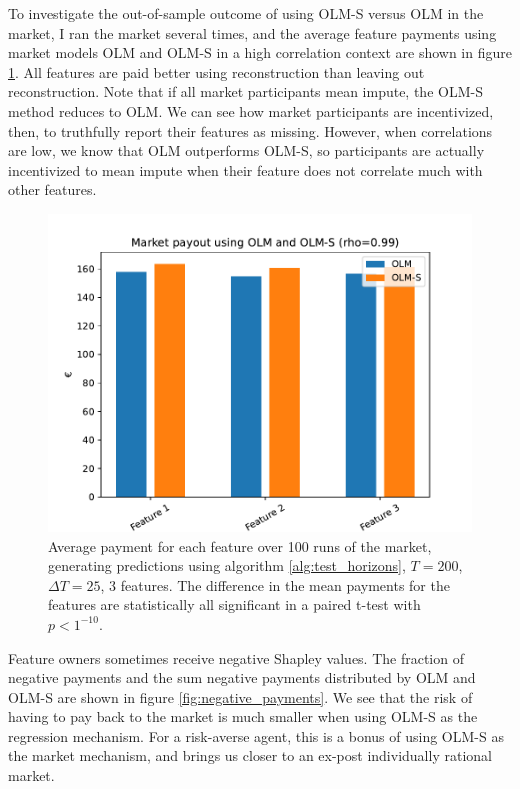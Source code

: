 To investigate the out-of-sample outcome of using OLM-S versus OLM in the
market, I ran the market several times, and the average feature payments using
market models OLM and OLM-S in a high correlation context are shown in figure
\ref{fig:payout_high_corr}. All features are paid better using reconstruction
than leaving out reconstruction. Note that if all market participants mean
impute, the OLM-S method reduces to OLM. We can see how market participants are
incentivized, then, to truthfully report their features as missing. However,
when correlations are low, we know that OLM outperforms OLM-S, so participants
are actually incentivized to mean impute when their feature does not correlate
much with other features.


\begin{figure}
  \centering
  \includegraphics[width=.9\linewidth]{Pictures/payout_rho099.pdf}
  \caption{Average payment for each feature over 100 runs of the market, generating predictions using algorithm \ref{alg:test_horizons}, $T=200$, $\Delta T=25$, 3 features. The difference in the mean payments for the features are statistically all significant in a paired t-test with $p<1^{-10}$.}
  \label{fig:payout_high_corr}
\end{figure}



Feature owners sometimes receive negative Shapley values. The fraction of
negative payments and the sum negative payments distributed by OLM and OLM-S
are shown in figure \ref{fig:negative_payments}. We see that the risk of having
to pay back to the market is much smaller when using OLM-S as the regression
mechanism. For a risk-averse agent, this is a bonus of using OLM-S as the
market mechanism, and brings us closer to an ex-post individually rational
market.

